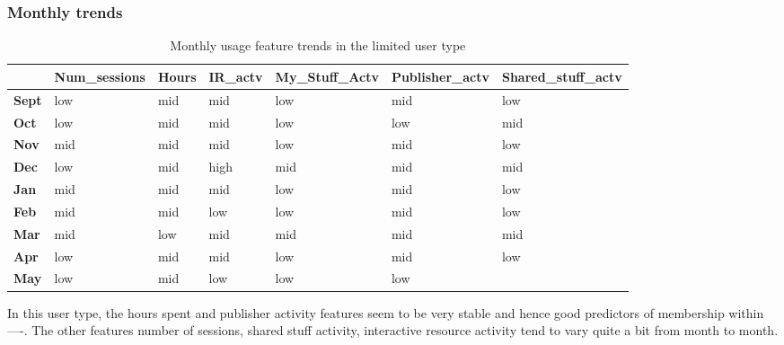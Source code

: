 \documentclass{acm_proc_article-sp}
\begin{document}
\subsubsection{Monthly trends}
\begin{table}
\caption{Monthly usage feature trends in the limited user type}
\begin{tabular}{|p{1cm}|p{1cm}|p{1cm}|p{1cm}|p{1cm}|p{1cm}|p{1cm}|}
 & Num\_sessions & Hours & IR\_actv & My\_Stuff\_Actv & Publisher\_actv & Shared\_stuff\_actv \\ \hline
\textbf{Sept} & low                                    & mid   & mid         & low             & mid            & low                 \\  \hline
\textbf{Oct}   & low                                    & mid   & mid         & low             & low            & mid                 \\  \hline
\textbf{Nov}  & mid                                    & mid   & mid         & low             & mid            & low                 \\  \hline
\textbf{Dec}  & low                                    & mid   & high        & mid             & mid            & mid                 \\  \hline
\textbf{Jan}   & mid                                    & mid   & mid         & low             & mid            & low                 \\ \hline
\textbf{Feb}  & mid                                    & mid   & low         & low             & mid            & low                 \\  \hline
\textbf{Mar}     & mid                                    & low   & mid         & mid             & mid            & mid                 \\ \hline
\textbf{Apr}     & low                                    & mid   & mid         & low             & mid            & low                 \\ \hline
\textbf{May}       & low                                    & mid   & low         & low             & low            &                    
\end{tabular}
\end{table}
In this user type, the hours spent and publisher activity features seem to be very stable and hence good predictors of membership within ----. The other features number of sessions, shared stuff activity, interactive resource activity tend to vary quite a bit from month to month.
\end{document}
